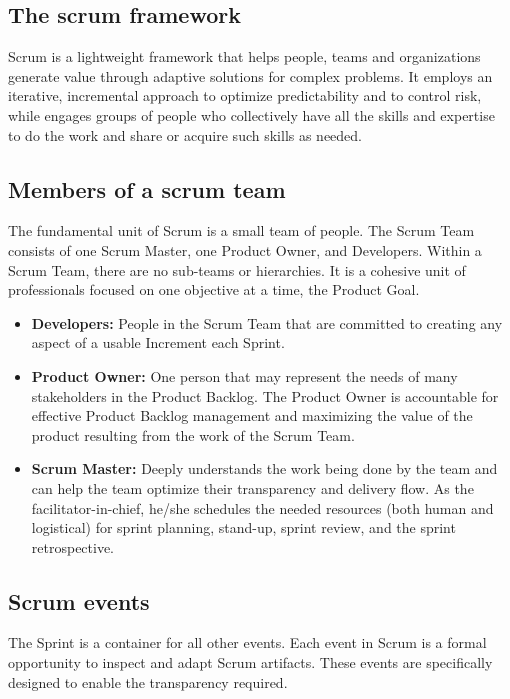 \subsection{The scrum framework}
Scrum is a lightweight framework that helps people, teams and organizations generate value through adaptive
solutions for complex problems. It employs an iterative, incremental approach to optimize predictability
and to control risk, while engages groups of people who collectively have all the skills and expertise
to do the work and share or acquire such skills as needed.

\subsection{Members of a scrum team }
The fundamental unit of Scrum is a small team of people. The Scrum Team consists of
one Scrum Master, one Product Owner, and Developers. Within a Scrum Team, there are no sub-teams
or hierarchies. It is a cohesive unit of professionals focused on one objective at a time,
the Product Goal. \cite{scrumguides}

\begin{itemize}
    \item \textbf{Developers:} People in the Scrum Team that are committed to creating any aspect
          of a usable Increment each Sprint.
    \item \textbf{Product Owner:} One person that may represent the needs of many stakeholders
          in the Product Backlog. The Product Owner is accountable for effective Product Backlog management
          and maximizing the value of the product resulting from the work of the Scrum Team.
    \item \textbf{Scrum Master:} Deeply understands the work being done by the team and
          can help the team optimize their transparency and delivery flow. As the facilitator-in-chief,
          he/she schedules the needed resources (both human and logistical) for sprint planning, stand-up,
          sprint review, and the sprint retrospective.
\end{itemize}
\raggedbottom

\subsection{Scrum events}
The Sprint is a container for all other events. Each event in Scrum is a formal opportunity to inspect
and adapt Scrum artifacts. These events are specifically designed to enable the transparency required.

